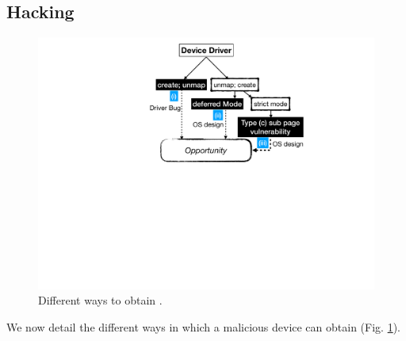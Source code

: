 \subsection{Hacking~\oportunity{}}\label{sec:shinfo}

\begin{figure}[t]
    \centering
    \includegraphics[width=\linewidth]{figs/road_to_op.pdf}
    \caption{Different ways to obtain \oportunity.}
    \label{fig:road_to_op}
\end{figure}

We now detail the different ways in which a malicious device can obtain \oportunity{} (Fig. \ref{fig:road_to_op}).

